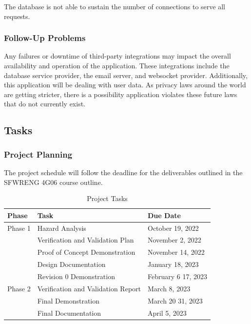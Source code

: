 \documentclass[12pt]{article}
\begin{document}
The database is not able to sustain the number of connections to serve all requests.

\subsubsection{Follow-Up Problems}

Any failures or downtime of third-party integrations may impact the overall availability and
operation of the application. These integrations include the database service provider, the email
server, and websocket provider. Additionally, this application will be dealing with user data. As
privacy laws around the world are getting stricter, there is a possibility application violates
these future laws that do not currently exist.

\subsection{Tasks}
\subsubsection{Project Planning}
The project schedule will follow the deadline for the deliverables outlined in the SFWRENG 4G06
course outline.

\begin{table}[H]
	\centering
	\caption{Project Tasks}
	\vspace{5pt}
	\begin{tabular}{|p{}|p{}|p{}|}
		\hline
		\textbf{Phase} & \textbf{Task}                      & \textbf{Due Date}                 \\
		\hline
		Phase 1        & Hazard Analysis                    & October 19, 2022                  \\
		\cline{2-3}    & Verification and Validation Plan   & November 2, 2022                  \\
		\cline{2-3}    & Proof of Concept Demonstration     & November 14, 2022                 \\
		\cline{2-3}    & Design Documentation               & January 18, 2023                  \\
		\cline{2-3}    & Revision 0 Demonstration           & February 6 \textemdash{} 17, 2023 \\
		\hline
		Phase 2        & Verification and Validation Report & March 8, 2023                     \\
		\cline{2-3}    & Final Demonstration                & March 20 \textemdash{} 31, 2023   \\
		\cline{2-3}    & Final Documentation                & April 5, 2023                     \\
		\hline
	\end{tabular}

	\label{project_tasks}
\end{table}
\end{document}
